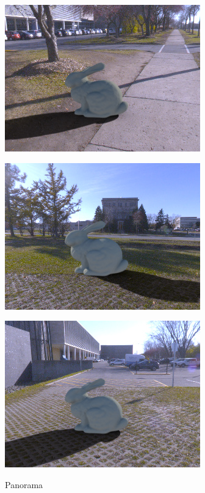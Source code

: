 \begin{minipage}{\linewidth}
\begin{multicols}{4}
\includegraphics[width=\mywidth]{AG8A2875_Panorama_hdr-corrected.jpg}

\includegraphics[width=\mywidth]{AG8A2917_Panorama_hdr-corrected_011.jpg}

\includegraphics[width=\mywidth]{AG8A2917_Panorama_hdr-corrected_016.jpg}



\vfill\null
\columnbreak

Panorama\\



\end{multicols}
\end{minipage}

